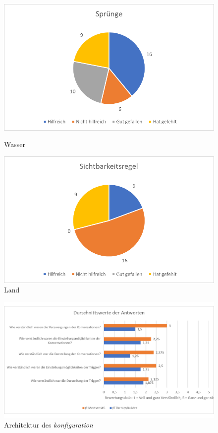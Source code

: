 \begin{figure}
   \begin{minipage}[b]{.49\linewidth} %
      \includegraphics[width=\linewidth]{pictures/diagramme/aussagenspr}
      \caption{Wasser}
   \end{minipage}
   \hspace{.01\linewidth}%
   \begin{minipage}[b]{.49\linewidth} %
      \includegraphics[width=\linewidth]{pictures/diagramme/aussagensichtb}
      \caption{Land}
   \end{minipage}
\end{figure}

\begin{figure}[h]
\centering
\includegraphics[width=1\textwidth]{pictures/diagramme/antwortendurchsch1}
\caption{Architektur des \emph{konfiguration}}
\label{antwortendurchsch1}
\end{figure}

